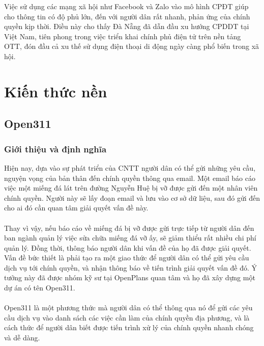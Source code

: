 \documentclass[a4paper]{article}
\begin{document}
Việc sử dụng các mạng xã hội như Facebook và Zalo vào mô hình CPĐT giúp cho thông tin có độ phủ lớn, đến với người dân rất nhanh, phản ứng của chính quyền kịp thời. Điều này cho thấy Đà Nẵng đã dẫn đầu xu hướng CPDDT tại Việt Nam, tiên phong trong việc triển khai chính phủ điện tử trên nền tảng OTT, đón đầu cả xu thế sử dụng điện thoại di động ngày càng phổ biến trong xã hội.
\section{Kiến thức nền}
\subsection{Open311}
\subsubsection{Giới thiệu và định nghĩa}
Hiện nay, dựa vào sự phát triển của CNTT người dân có thể gửi những yêu cầu, nguyện vọng của bản thân đến chính quyền thông qua email. Một email báo cáo việc một miếng đá lát trên đường Nguyễn Huệ bị vỡ được gửi đến một nhân viên chính quyền. Người này sẽ lấy đoạn email và lưu vào cơ sở dữ liệu, sau đó gửi đến cho ai đó cần quan tâm giải quyết vấn đề này.\\
\\
Thay vì vậy, nếu báo cáo về miếng đá bị vỡ được gửi trực tiếp từ người dân đến ban ngành quản lý việc sửa chữa miếng đá vỡ ấy, sẽ giảm thiểu rất nhiều chi phí quản lý. Đồng thời, thông báo người dân khi vấn đề của họ đã được giải quyết. Vấn đề bức thiết là phải tạo ra một giao thức để người dân có thể gửi yêu cầu dịch vụ tới chính quyền, và nhận thông báo về tiến trình giải quyết vấn đề đó. Ý tưởng này đã được nhóm kỹ sư tại OpenPlans quan tâm và họ đã xây dựng một dự án có tên Open311.\\
\\
Open311 là một phương thức mà người dân có thể thông qua nó để gửi các yêu cầu dịch vụ vào danh sách các việc cần làm của chính quyền địa phương, và là cách thức để người dân biết được tiến trình xử lý của chính quyền nhanh chóng và dễ dàng.
\end{document}
